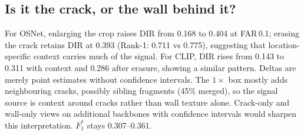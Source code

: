 \subsection{Is it the crack, or the wall behind it?}
\label{sec:controls}

For OSNet, enlarging the crop raises DIR from 0.168 to 0.404 at FAR\,0.1; erasing the crack retains DIR at 0.393 (Rank-1: 0.711 vs 0.775), suggesting that location-specific context carries much of the signal.
For CLIP, DIR rises from 0.143 to 0.311 with context and 0.286 after erasure, showing a similar pattern.
Deltas are merely point estimates without confidence intervals.
The $1\times$ box mostly adds neighbouring cracks, possibly sibling fragments (45\% merged), so the signal source is context around cracks rather than wall texture alone.
Crack-only and wall-only views on additional backbones with confidence intervals would sharpen this interpretation.
$F_{1}^{*}$ stays 0.307--0.361.
